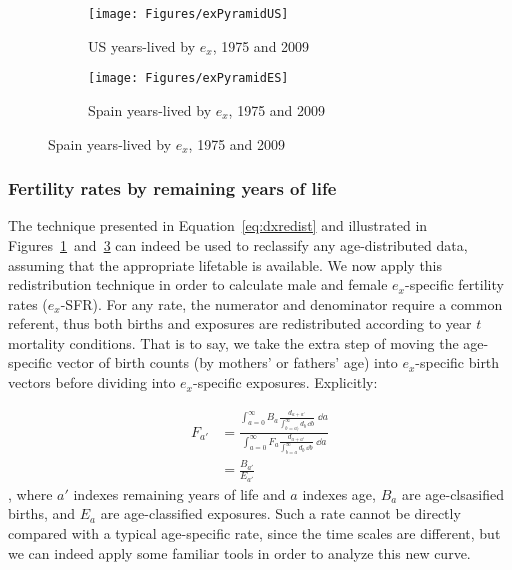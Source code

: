 \begin{figure}
        \centering
        \begin{subfigure}
                \centering
                \caption{US years-lived by $e_x$, 1975 and 2009}
                \texttt{[image: Figures/exPyramidUS]}
                \label{fig:exPyrUS}
        \end{subfigure}
        \begin{subfigure}
                \centering
                \caption{Spain years-lived by $e_x$, 1975 and 2009}
                \texttt{[image: Figures/exPyramidES]}
               
                \label{fig:exPyrES}
        \end{subfigure}
\end{figure}

\subsubsection{Fertility rates by remaining years of life}
The technique presented in Equation~\ref{eq:dxredist} and illustrated in
Figures~\ref{fig:exPyrUS}~and~\ref{fig:exPyrES} can indeed be used to reclassify
any age-distributed data, assuming that the appropriate lifetable is available.
We now apply this redistribution technique in order to calculate male and 
female $e_x$-specific fertility rates ($e_x$-SFR). For any rate, the numerator 
and denominator require a common referent, thus both births and exposures are 
redistributed according to year $t$ mortality conditions. That
is to say, we take the extra step of moving the age-specific vector
of birth counts (by mothers' or fathers' age) into $e_x$-specific birth
vectors before dividing into $e_x$-specific exposures. Explicitly:

\begin{align}
F_{a'} &= \frac{\int _{a = 0} ^{\infty} B_a \frac{d_{a + a'}}{\int _{b = a)}
^{\infty} d_b\, \dd b} \;\dd a}{\int _{a = 0} ^{\infty} F_a \frac{d_{a + a'}}{\int _{b = a} ^{\infty} d_b\, \dd b} \;\dd a} \\
 &= \frac{B_{a'}}{E_{a'}}
\end{align}
, where $a'$ indexes remaining years of life and $a$ indexes age, $B_a$ are
age-clsasified births, and $E_a$ are age-classified exposures. Such a rate
cannot be directly compared with a typical age-specific rate, since the time scales are different, but we 
can indeed apply some familiar tools in order to analyze this new curve.

